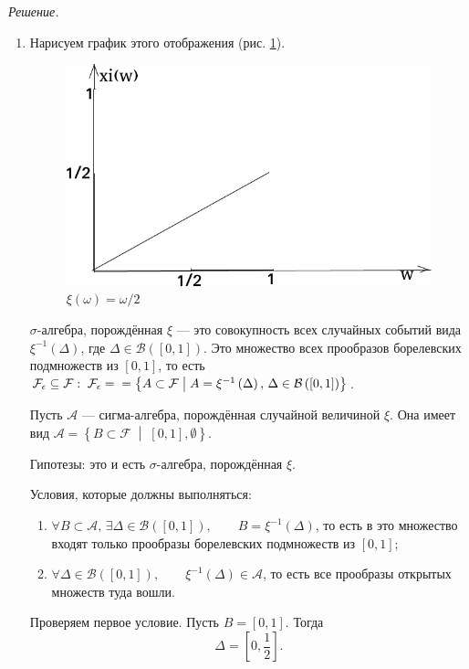 \textit{Решение.}
\begin{enumerate}[label=\alph*)]
\item Нарисуем график этого отображения (рис. \ref{fig:818}).

\begin{figure}[h!]
  \centering
  \includegraphics[width=.4\textwidth]{./pictures/8_18.png}
  \caption{$ \xi \left( \omega \right) = \omega/2$}
  \label{fig:818}
\end{figure}

$ \sigma $-алгебра, порождённая $ \xi $ ---
это совокупность всех случайных событий вида $ \xi^{-1} \left( \Delta \right) $, где $ \Delta \in \mathcal{B} \left( \left[ 0, 1 \right] \right) $.
Это множество всех прообразов борелевских подмножеств из $ \left[ 0, 1 \right] $,
то есть
$ \mathcal{F_{ \epsilon }} \subseteq \mathcal{F}: \;
\mathcal{F_{ \epsilon }} = \\
= \left\{ A \subset \mathcal{F} \; \middle| \; A = \xi^{-1} \left( \Delta \right), \, \Delta \in \mathcal{B} \left( \left[ 0, 1 \right] \right) \right\} $.

Пусть $ \mathcal{A} $ --- сигма-алгебра, порождённая случайной величиной $ \xi $.
Она имеет вид $ \mathcal{A} = \left\{ B \subset \mathcal{F} \; \middle| \; \left[ 0, 1 \right], \emptyset \right\} $.

Гипотезы: это и есть $ \sigma $-алгебра, порождённая $ \xi $.

Условия, которые должны выполняться:
\begin{enumerate}
\item $ \forall B \subset \mathcal{A}, \, \exists \Delta \in \mathcal{B} \left( \left[ 0, 1 \right] \right), \qquad B = \xi^{-1} \left( \Delta \right) $, то есть в это множество входят только прообразы борелевских подмножеств из $ \left[ 0, 1 \right] $;
\item $ \forall \Delta \in \mathcal{B} \left( \left[ 0, 1 \right] \right), \qquad \xi^{-1} \left( \Delta \right) \in \mathcal{A} $,
то есть все прообразы открытых множеств туда вошли.
\end{enumerate}

Проверяем первое условие.
Пусть $B = \left[ 0, 1 \right] $.
Тогда
$$ \Delta =
\left[ 0, \frac{1}{2} \right].$$


\end{enumerate}
